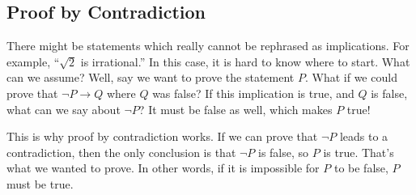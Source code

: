 \documentclass[10pt,]{book}
\theoremstyle{plain}
\theoremstyle{definition}
\theoremstyle{definition}
\theoremstyle{definition}
\numberwithin{equation}{chapter}
\def\imp{\rightarrow}
\begin{document}
\subsection[Proof by Contradiction]{Proof by Contradiction}\label{subsection-34}

%
\par

There might be statements which really cannot be rephrased as implications. For example, ``\(\sqrt 2\) is irrational.'' In this case, it is hard to know where to start. What can we assume? Well, say we want to prove the statement \(P\). What if we could prove that \(\neg P \imp Q\) where \(Q\) was false? If this implication is true, and \(Q\) is false, what can we say about \(\neg P\)? It must be false as well, which makes \(P\) true!
%
\par

This is why proof by contradiction works. If we can prove that \(\neg P\) leads to a contradiction, then the only conclusion is that \(\neg P\) is false, so \(P\) is true. That's what we wanted to prove. In other words, if it is impossible for \(P\) to be false, \(P\) must be true.
%
\par
\end{document}
